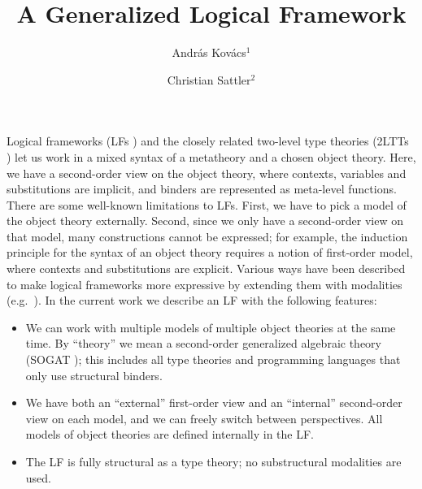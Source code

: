 \documentclass{easychair}
\title{A Generalized Logical Framework}
\author{Andr\'as Kov\'acs$^{1}$ \and Christian Sattler$^{2}$}
\institute{
  Chalmers University of Technology \& University of Gothenburg, Sweden \\
  $^{1}$\,\email{andrask@chalmers.se}\,\,\,$^{2}$\,\email{sattler@chalmers.se}
}
\begin{document}
\maketitle

Logical frameworks (LFs \cite{Harper93lf}) and the closely related two-level type
theories (2LTTs \cite{twolevel}) let us work in a mixed syntax of a metatheory and a
chosen object theory. Here, we have a second-order view on the object theory,
where contexts, variables and substitutions are implicit, and binders are
represented as meta-level functions. There are some well-known limitations to
LFs. First, we have to pick a model of the object theory externally. Second,
since we only have a second-order view on that model, many constructions cannot
be expressed; for example, the induction principle for the syntax of an object
theory requires a notion of first-order model, where contexts and substitutions
are explicit. Various ways have been described to make logical frameworks more
expressive by extending them with modalities (e.g.\ \cite{sterlingthesis,DBLP:conf/lics/Hofmann99,DBLP:journals/corr/abs-1901-03378,orton_et_al:LIPIcs:2016:6564}). In the current work we
describe an LF with the following features:
\begin{itemize}
\item We can work with multiple models of multiple object theories at the same
  time. By ``theory'' we mean a second-order generalized algebraic theory
  (SOGAT \cite{uemura,DBLP:conf/fscd/KaposiX24}); this includes all type theories and programming languages that
  only use structural binders.
\item We have both an ``external'' first-order view and an ``internal''
  second-order view on each model, and we can freely switch between
  perspectives. All models of object theories are defined internally in the LF.
\item The LF is fully structural as a type theory; no substructural modalities
  are used.
\end{itemize}
\end{document}
